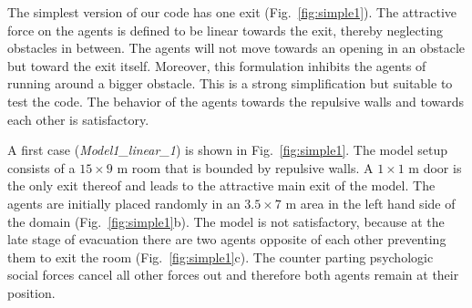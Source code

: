 \documentclass[11pt]{article}
\begin{document}
The simplest version of our code has one exit (Fig.~\ref{fig:simple1}). The attractive force on the agents is defined to be linear towards the exit, thereby neglecting obstacles in between. The agents will not move towards an opening in an obstacle but toward the exit itself. Moreover, this formulation inhibits the agents of running around a bigger obstacle. This is a strong simplification but suitable to test the code. The behavior of the agents towards the repulsive walls and towards each other is satisfactory.

A first case ({\it Model1\_linear\_1}) is shown in Fig.~\ref{fig:simple1}. The model setup consists of a $15\times9$ m room that is bounded by repulsive walls. A $1\times1$ m door is the only exit thereof and leads to the attractive main exit of the model. The agents are initially placed randomly in an $3.5\times7$ m area in the left hand side of the domain (Fig.~\ref{fig:simple1}b). The model is not satisfactory, because at the late stage of evacuation there are two agents opposite of each other preventing them to exit the room (Fig.~\ref{fig:simple1}c). The counter parting psychologic social forces cancel all other forces out and therefore both agents remain at their position.
\end{document}
